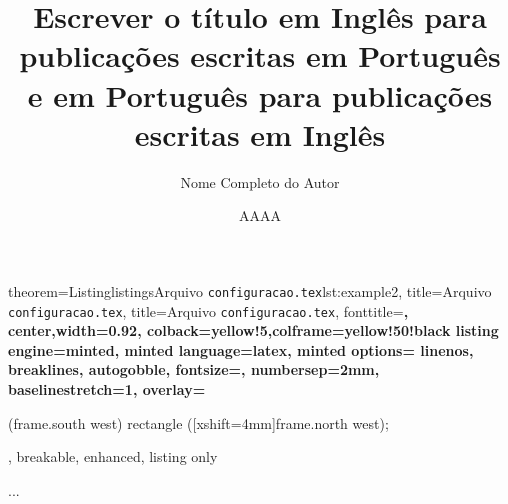 \documentclass[10pt]{beamer}
\begin{document}

\begin{frame}{}
    \begin{tcblisting}{
        theorem={Listing}{listings}{Arquivo {\tt configuracao.tex}}{lst:example2},
                title=Arquivo {\tt configuracao.tex},
        title=Arquivo {\tt configuracao.tex},
        fonttitle=\small\bfseries,
        center,width=0.92\paperwidth,
        colback=yellow!5,colframe=yellow!50!black
        listing engine=minted,
        minted language=latex,
        minted options={%
            linenos,
            breaklines,
            autogobble,
            fontsize=\small,
            numbersep=2mm,
            baselinestretch=1},
        overlay={%
        \begin{tcbclipinterior}
            \fill[gray!25] (frame.south west) rectangle ([xshift=4mm]frame.north west);
        \end{tcbclipinterior}},
        breakable, enhanced, listing only}
        \title{Escrever o t\'{i}tulo em Ingl\^{e}s para publicaç\~{o}es escritas em Portugu\^{e}s e em Portugu\^{e}s para publicaç\~{o}es escritas em Ingl\^{e}s} 
        \author{Nome Completo do Autor}
        \date{AAAA}
        ... 
    \end{tcblisting}
\end{frame}
\end{document}
